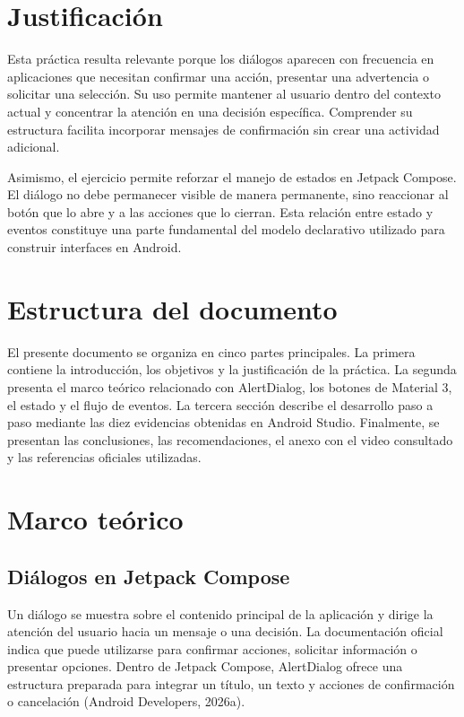 \documentclass[12pt,a4paper]{article}
\begin{document}
\section{Justificación}

Esta práctica resulta relevante porque los diálogos aparecen con frecuencia en aplicaciones que necesitan confirmar una acción, presentar una advertencia o solicitar una selección. Su uso permite mantener al usuario dentro del contexto actual y concentrar la atención en una decisión específica. Comprender su estructura facilita incorporar mensajes de confirmación sin crear una actividad adicional.

Asimismo, el ejercicio permite reforzar el manejo de estados en Jetpack Compose. El diálogo no debe permanecer visible de manera permanente, sino reaccionar al botón que lo abre y a las acciones que lo cierran. Esta relación entre estado y eventos constituye una parte fundamental del modelo declarativo utilizado para construir interfaces en Android.

\section{Estructura del documento}

El presente documento se organiza en cinco partes principales. La primera contiene la introducción, los objetivos y la justificación de la práctica. La segunda presenta el marco teórico relacionado con AlertDialog, los botones de Material 3, el estado y el flujo de eventos. La tercera sección describe el desarrollo paso a paso mediante las diez evidencias obtenidas en Android Studio. Finalmente, se presentan las conclusiones, las recomendaciones, el anexo con el video consultado y las referencias oficiales utilizadas.

\section{Marco teórico}

\subsection{Diálogos en Jetpack Compose}

Un diálogo se muestra sobre el contenido principal de la aplicación y dirige la atención del usuario hacia un mensaje o una decisión. La documentación oficial indica que puede utilizarse para confirmar acciones, solicitar información o presentar opciones. Dentro de Jetpack Compose, AlertDialog ofrece una estructura preparada para integrar un título, un texto y acciones de confirmación o cancelación (Android Developers, 2026a).
\end{document}
